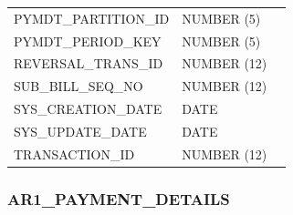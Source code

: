 \documentclass[12pt,twoside]{article}
\begin{document}
\begin{longtable}{lll}
 PYMDT\_PARTITION\_ID         &  NUMBER (5)          &                        \\
 PYMDT\_PERIOD\_KEY           &  NUMBER (5)          &                        \\
 REVERSAL\_TRANS\_ID          &  NUMBER (12)         &                        \\
 SUB\_BILL\_SEQ\_NO           &  NUMBER (12)         &                        \\
 SYS\_CREATION\_DATE          &  DATE                &                        \\
 SYS\_UPDATE\_DATE            &  DATE                &                        \\
 TRANSACTION\_ID              &  NUMBER (12)         &                        \\
\hline
\end{longtable}



\normalsize
\subsubsection{AR1\_PAYMENT\_DETAILS}
\label{sec-11-6-10}
\end{document}
